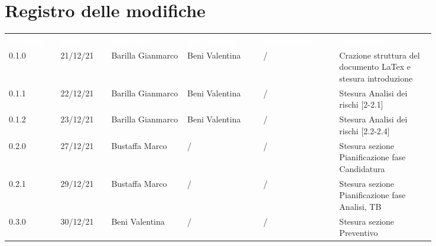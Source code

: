 \section*{Registro delle modifiche}

{\renewcommand{\arraystretch}{1.5}
\scriptsize
\begin{tabular}{p{0.10\linewidth}p{0.10\linewidth}p{0.15\linewidth}p{0.15\linewidth}p{0.15\linewidth}p{0.19\linewidth}}
	\rowcolor[RGB]{33, 73, 50}
	\textcolor{white}{\textbf{Versione}} & \textcolor{white}{\textbf{Data}} &
	\textcolor{white}{\textbf{Redattore}} & \textcolor{white}{\textbf{Verificatore}} &
	\textcolor{white}{\textbf{Approvatore}} & \textcolor{white}{\textbf{Descrizione}}\\
	\rowcolor[RGB]{216, 235, 171}
	0.1.0 & 21/12/21 & Barilla Gianmarco & Beni Valentina & / & Crazione struttura del documento LaTex e stesura introduzione\\
	\rowcolor[RGB]{233, 245, 206}
	0.1.1 & 22/12/21 & Barilla Gianmarco & Beni Valentina & / & Stesura Analisi dei rischi [2-2.1]\\
	\rowcolor[RGB]{216, 235, 171}
	0.1.2 & 23/12/21 & Barilla Gianmarco& Beni Valentina & / & Stesura Analisi dei rischi [2.2-2.4]\\
	\rowcolor[RGB]{233, 245, 206}
	0.2.0 & 27/12/21 & Bustaffa Marco& / & / & Stesura sezione Pianificazione fase Candidatura\\
	\rowcolor[RGB]{216, 235, 171}
	0.2.1 & 29/12/21 & Bustaffa Marco& / & / & Stesura sezione Pianificazione fase Analisi, TB\\
	\rowcolor[RGB]{233, 245, 206}
	0.3.0 & 30/12/21 & Beni Valentina& / & / & Stesura sezione Preventivo\\
\end{tabular}	
}